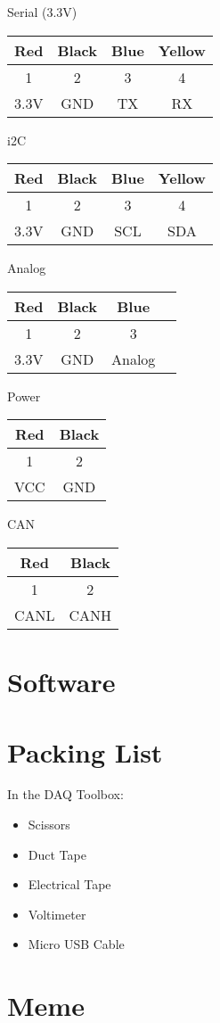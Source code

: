 \documentclass[12pt]{article}
\begin{document}
\noindent Serial (3.3V)

\begin{tabular}{|c|c|c|c|}
\hline
Red & Black & Blue & Yellow \\
    \hline
1 & 2 & 3 & 4 \\
    \hline
3.3V & GND & TX & RX \\
    \hline
\end{tabular}
\vspace{1em}

\noindent i2C

\begin{tabular}{|c|c|c|c|}
\hline
Red & Black & Blue & Yellow \\
\hline
1 & 2 & 3 & 4 \\
\hline
3.3V & GND & SCL & SDA\\
\hline
\end{tabular}
\vspace{1em}

\noindent Analog

\begin{tabular}{|c|c|c|c|}
    \hline
    Red & Black & Blue \\
    \hline
    1 & 2 & 3 \\
    \hline
    3.3V & GND & Analog \\
    \hline
\end{tabular}
\vspace{1em}

\noindent Power

\begin{tabular}{|c|c|}
\hline
Red & Black \\
\hline
1 & 2 \\
\hline
VCC & GND \\
\hline
\end{tabular}
\vspace{1em}

\noindent CAN

\begin{tabular}{|c|c|}
    \hline
    Red & Black \\
    \hline
    1 & 2 \\
    \hline
    CANL & CANH \\
    \hline
\end{tabular}
\section{Software}
\section{Packing List}
In the DAQ Toolbox:
\begin{itemize}
    \item Scissors
    \item Duct Tape
    \item Electrical Tape
    \item Voltimeter
    \item Micro USB Cable
\end{itemize}
\section{Meme}
\end{document}
